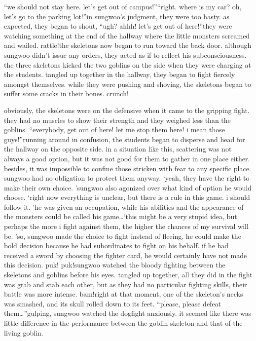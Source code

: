 “we should not stay here.
 let’s get out of campus!”“right.
 where is my car? oh, let’s go to the parking lot!”in sungwoo’s judgment, they were too hasty.
as expected, they began to shout, “ugh? ahhh! let’s get out of here!”they were watching something at the end of the hallway where the little monsters screamed and wailed.
rattle!the skeletons now began to run toward the back door.
 although sungwoo didn’t issue any orders, they acted as if to reflect his subconsciousness.
the three skeletons kicked the two goblins on the side when they were charging at the students.
tangled up together in the hallway, they began to fight fiercely amongst themselves.
 while they were pushing and shoving, the skeletons began to suffer some cracks in their bones.
crunch!

obviously, the skeletons were on the defensive when it came to the gripping fight.
 they had no muscles to show their strength and they weighed less than the goblins.
“everybody, get out of here! let me stop them here! i mean those guys!”running around in confusion, the students began to disperse and head for the hallway on the opposite side.
 in a situation like this, scattering was not always a good option, but it was not good for them to gather in one place either.
besides, it was impossible to confine those stricken with fear to any specific place.
 sungwoo had no obligation to protect them anyway.
‘yeah, they have the right to make their own choice.
’sungwoo also agonized over what kind of option he would choose.
‘right now everything is unclear, but there is a rule in this game.
 i should follow it.
’he was given an occupation, while his abilities and the appearance of the monsters could be called his game…‘this might be a very stupid idea, but perhaps the more i fight against them, the higher the chances of my survival will be.
’so, sungwoo made the choice to fight instead of fleeing.
 he could make the bold decision because he had subordinates to fight on his behalf.
 if he had received a sword by choosing the fighter card, he would certainly have not made this decision.
puk! puk!sungwoo watched the bloody fighting between the skeletons and goblins before his eyes.
 tangled up together, all they did in the fight was grab and stab each other, but as they had no particular fighting skills, their battle was more intense.
bam!right at that moment, one of the skeleton’s necks was smashed, and its skull rolled down to its feet.
“please, please defeat them…”gulping, sungwoo watched the dogfight anxiously.
 it seemed like there was little difference in the performance between the goblin skeleton and that of the living goblin.


 